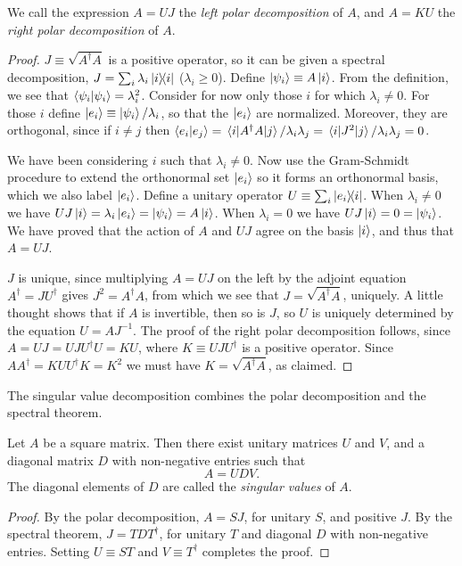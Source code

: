 We call the expression $A = UJ$ the \emph{left polar decomposition} of $A$, and
$A = KU$ the \emph{right polar decomposition} of $A$.

\begin{proof}
  $J \equiv \sqrt{A^\dagger A}$ is a positive operator, so it can be given a
  spectral decomposition, $J = \sum_i \lambda_i \ketbra{i}{i}$ ($\lambda_i \geq
  0$). Define $\ket{\psi_i} \equiv A\ket{i}$. From the definition, we see that
  $\braket{\psi_i}{\psi_i} = \lambda_i^2$. Consider for now only those $i$ for
  which $\lambda_i \neq 0$. For those $i$ define $\ket{e_i} \equiv \ket{\psi_i}
  /\lambda_i$, so that the $\ket{e_i}$ are normalized. Moreover, they are
  orthogonal, since if $i \neq j$ then $\braket{e_i}{e_j} = \mel{i}{A^\dagger A
  }{j}/\lambda_i\lambda_j = \mel{i}{J^2}{j}/\lambda_i\lambda_j = 0$.

  We have been considering $i$ such that $\lambda_i \neq 0$. Now use the
  Gram-Schmidt procedure to extend the orthonormal set $\ket{e_i}$ so it forms
  an orthonormal basis, which we also label $\ket{e_i}$. Define a unitary
  operator $U \equiv \sum_i \ketbra{e_i}{i}$. When $\lambda_i \neq 0$ we have
  $UJ\ket{i} = \lambda_i\ket{e_i} = \ket{\psi_i} = A\ket{i}$. When $\lambda_i =
  0$ we have $UJ\ket{i} = 0 = \ket{\psi_i}$. We have proved that the action of
  $A$ and $UJ$ agree on the basis $\ket{i}$, and thus that $A = UJ$.

  $J$ is unique, since multiplying $A = UJ$ on the left by the adjoint equation
  $A^\dagger = JU^\dagger$ gives $J^2 = A^\dagger A$, from which we see that $J
  = \sqrt{A^\dagger A}$, uniquely. A little thought shows that if $A$ is
  invertible, then so is $J$, so $U$ is uniquely determined by the equation $U
  = AJ^{-1}$. The proof of the right polar decomposition follows, since $A = UJ
  = UJU^\dagger U = KU$, where $K \equiv UJU^\dagger$ is a positive operator.
  Since $AA^\dagger = KUU^\dagger K = K^2$ we must have $K = \sqrt{A^\dagger
  A}$, as claimed.
\end{proof}

The singular value decomposition combines the polar decomposition and the
spectral theorem.

\begin{corollary}
  Let $A$ be a square matrix. Then there exist unitary matrices $U$ and $V$,
  and a diagonal matrix $D$ with non-negative entries such that
  \begin{equation*}
    A = UDV.
  \end{equation*}
  The diagonal elements of $D$ are called the \emph{singular values} of $A$.
\end{corollary}

\begin{proof}
  By the polar decomposition, $A = SJ$, for unitary $S$, and positive $J$. By
  the spectral theorem, $J = TDT^\dagger$, for unitary $T$ and diagonal $D$
  with non-negative entries. Setting $U \equiv ST$ and $V \equiv T^\dagger$
  completes the proof.
\end{proof}

